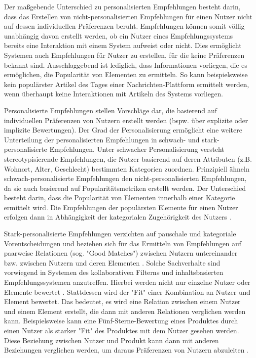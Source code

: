 Der maßgebende Unterschied zu personalisierten Empfehlungen besteht darin, dass das Erstellen von nicht-personalisierten Empfehlungen für einen Nutzer nicht auf dessen individuellen Präferenzen beruht.
Empfehlungen können somit völlig unabhängig davon erstellt werden, ob ein Nutzer eines Empfehlungssystems bereits eine Interaktion mit einem System aufweist oder nicht.
Dies ermöglicht Systemen auch Empfehlungen für Nutzer zu erstellen, für die keine Präferenzen bekannt sind.
Ausschlaggebend ist lediglich, dass Informationen vorliegen, die es ermöglichen, die Popularität von Elementen zu ermitteln.
So kann beispielsweise kein populärster Artikel des Tages einer Nachrichten-Plattform ermittelt werden, wenn überhaupt keine Interaktionen mit Artikeln des Systems vorliegen.

Personalisierte Empfehlungen stellen Vorschläge dar, die basierend auf individuellen Präferenzen von Nutzern erstellt werden (bspw. über explizite oder implizite Bewertungen).
Der Grad der Personalisierung ermöglicht eine weitere Unterteilung der personalisierten Empfehlungen in schwach- und stark-personali\-sierte Empfehlungen.
Unter schwacher Personalisierung versteht \textcite[S. 407]{unternährer:article} stereotypisierende Empfehlungen, die Nutzer basierend auf deren Attributen (z.B. Wohnort, Alter, Geschlecht) bestimmten Kategorien zuordnen.
Prinzipiell ähneln schwach-personalisierte Empfehlungen den nicht-personalisierten Empfehlungen, da sie auch basierend auf Popularitätsmetriken erstellt werden.
Der Unterschied besteht darin, dass die Popularität von Elementen innerhalb einer Kategorie ermittelt wird.
Die Empfehlungen der populärsten Elemente für einen Nutzer erfolgen dann in Abhängigkeit der kategorialen Zugehörigkeit des Nutzers \cite[S. 407ff.]{unternährer:article}.

Stark-personalisierte Empfehlungen verzichten auf pauschale und kategoriale Vorentscheidungen und beziehen sich für das Ermitteln von Empfehlungen auf paarweise Relationen (sog. "Good Matches") zwischen Nutzern untereinander bzw. zwischen Nutzern und deren Elementen \cite[S. 415]{unternährer:article}.
Solche Sachverhalte sind vorwiegend in Systemen des kollaborativen Filterns und inhaltsbasierten Empfehlungssystemen anzutreffen.
Hierbei werden nicht nur einzelne Nutzer oder Elemente bewertet \cite[S. 417]{unternährer:article}. 
Stattdessen wird der "Fit" einer Kombination an Nutzer und Element bewertet.
Das bedeutet, es wird eine Relation zwischen einem Nutzer und einem Element erstellt, die dann mit anderen Relationen verglichen werden kann.
Beispielsweise kann eine Fünf-Sterne-Bewertung eines Produktes durch einen Nutzer als starker "Fit" des Produktes mit dem Nutzer gesehen werden.
Diese Beziehung zwischen Nutzer und Produkt kann dann mit anderen Beziehungen verglichen werden, um daraus Präferenzen von Nutzern abzuleiten \cite[S. 417]{unternährer:article}.

